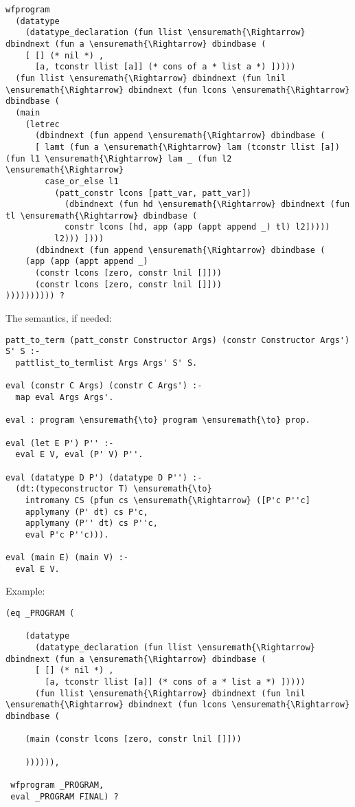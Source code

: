 \begin{verbatim}
wfprogram
  (datatype
    (datatype_declaration (fun llist \ensuremath{\Rightarrow} dbindnext (fun a \ensuremath{\Rightarrow} dbindbase (
    [ [] (* nil *) ,
      [a, tconstr llist [a]] (* cons of a * list a *) ]))))
  (fun llist \ensuremath{\Rightarrow} dbindnext (fun lnil \ensuremath{\Rightarrow} dbindnext (fun lcons \ensuremath{\Rightarrow} dbindbase (
  (main
    (letrec
      (dbindnext (fun append \ensuremath{\Rightarrow} dbindbase (
      [ lamt (fun a \ensuremath{\Rightarrow} lam (tconstr llist [a]) (fun l1 \ensuremath{\Rightarrow} lam _ (fun l2 \ensuremath{\Rightarrow}
        case_or_else l1
          (patt_constr lcons [patt_var, patt_var])
            (dbindnext (fun hd \ensuremath{\Rightarrow} dbindnext (fun tl \ensuremath{\Rightarrow} dbindbase (
            constr lcons [hd, app (app (appt append _) tl) l2]))))
          l2))) ])))
      (dbindnext (fun append \ensuremath{\Rightarrow} dbindbase (
    (app (app (appt append _)
      (constr lcons [zero, constr lnil []]))
      (constr lcons [zero, constr lnil []]))
)))))))))) ?
\end{verbatim}

The semantics, if needed:

\begin{verbatim}
patt_to_term (patt_constr Constructor Args) (constr Constructor Args') S' S :-
  pattlist_to_termlist Args Args' S' S.

eval (constr C Args) (constr C Args') :-
  map eval Args Args'.

eval : program \ensuremath{\to} program \ensuremath{\to} prop.

eval (let E P') P'' :-
  eval E V, eval (P' V) P''.

eval (datatype D P') (datatype D P'') :-
  (dt:(typeconstructor T) \ensuremath{\to}
    intromany CS (pfun cs \ensuremath{\Rightarrow} ([P'c P''c]
    applymany (P' dt) cs P'c,
    applymany (P'' dt) cs P''c,
    eval P'c P''c))).

eval (main E) (main V) :-
  eval E V.
\end{verbatim}

Example:

\begin{verbatim}
(eq _PROGRAM (

    (datatype
      (datatype_declaration (fun llist \ensuremath{\Rightarrow} dbindnext (fun a \ensuremath{\Rightarrow} dbindbase (
      [ [] (* nil *) ,
        [a, tconstr llist [a]] (* cons of a * list a *) ]))))
      (fun llist \ensuremath{\Rightarrow} dbindnext (fun lnil \ensuremath{\Rightarrow} dbindnext (fun lcons \ensuremath{\Rightarrow} dbindbase (

    (main (constr lcons [zero, constr lnil []]))

    )))))),

 wfprogram _PROGRAM,
 eval _PROGRAM FINAL) ?
\end{verbatim}

